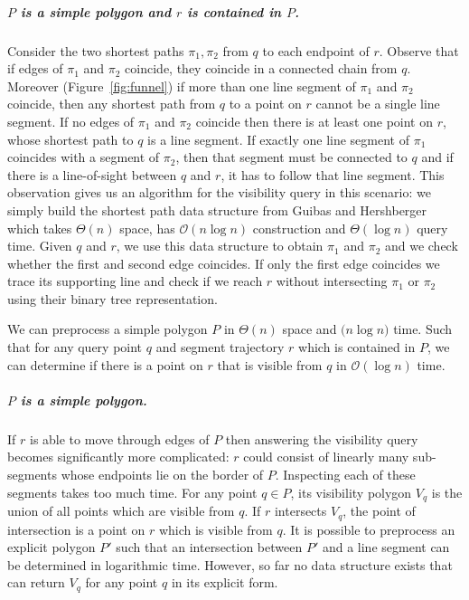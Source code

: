 \documentclass[a4paper, UKenglish]{lipics-v2018}
\begin{document}
\subparagraph{$P$ is a simple polygon and $r$ is contained in $P$.}
Consider the two shortest paths $\pi_1, \pi_2$ from $q$ to  each endpoint of $r$. Observe that if edges of $\pi_1$ and $\pi_2$ coincide, they coincide in a connected chain from $q$. Moreover (Figure~\ref{fig:funnel}) if more than one line segment of $\pi_1$ and $\pi_2$ coincide, then any shortest path from $q$ to a point on $r$ cannot be a single line segment. If no edges of $\pi_1$ and $\pi_2$ coincide then there is at least one point on $r$, whose shortest path to $q$ is a line segment. If exactly one line segment of $\pi_1$ coincides with a segment of $\pi_2$, then that segment must be connected to $q$ and if there is a line-of-sight between $q$ and $r$, it has to follow that line segment. This observation gives us an algorithm for the visibility query in this scenario: we simply build the shortest path data structure from Guibas and Hershberger which takes $\Theta(n)$ space, has $\mathcal{O}(n \log n)$ construction and $\Theta(\log n)$ query time. Given $q$ and $r$, we use this data structure to obtain $\pi_1$ and $\pi_2$ and we check whether the first and second edge coincides. If only the first edge coincides we trace its supporting line and check if we reach $r$ without intersecting $\pi_1$ or $\pi_2$ using their binary tree representation.

\begin{theorem}
We can preprocess a simple polygon $P$ in $\Theta(n)$ space and $\mathcal(n \log n)$ time. Such that for any query point $q$ and segment trajectory $r$ which is contained in $P$, we can determine if there is a point on $r$ that is visible from $q$ in $\mathcal{O}(\log n)$ time.
\end{theorem}




\subparagraph{$P$ is a simple polygon.}
If $r$ is able to move through edges of $P$ then answering the visibility query becomes significantly more complicated: $r$ could consist of linearly many sub-segments whose endpoints lie on the border of $P$. Inspecting each of these segments takes too much time. For any point $q \in P$, its visibility polygon $V_q$ is the union of all points which are visible from $q$. If $r$ intersects $V_q$, the point of intersection is a point on $r$ which is visible from $q$. It is possible to preprocess an explicit polygon $P'$ such that an intersection between $P'$ and a line segment can be determined in logarithmic time. However, so far no data structure exists that can return $V_q$ for any point $q$ in its explicit form.
\end{document}
